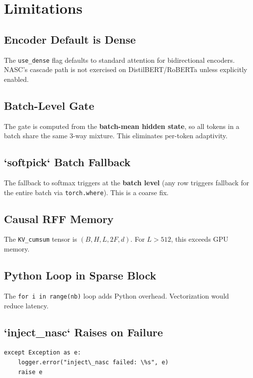 
\section{Limitations}

\subsection{Encoder Default is Dense}

The \texttt{use\_dense} flag defaults to standard attention for bidirectional 
encoders. NASC's cascade path is not exercised on DistilBERT/RoBERTa 
unless explicitly enabled.

\subsection{Batch-Level Gate}

The gate is computed from the \textbf{batch-mean hidden state}, so all tokens 
in a batch share the same 3-way mixture. This eliminates per-token 
adaptivity.

\subsection{`softpick` Batch Fallback}

The fallback to softmax triggers at the \textbf{batch level} (any row triggers 
fallback for the entire batch via \texttt{torch.where}). This is a coarse fix.

\subsection{Causal RFF Memory}

The \texttt{KV\_cumsum} tensor is $(B, H, L, 2F, d)$. For $L > 512$, this exceeds 
GPU memory.

\subsection{Python Loop in Sparse Block}

The \texttt{for i in range(nb)} loop adds Python overhead. Vectorization would 
reduce latency.

\subsection{`inject\_nasc` Raises on Failure}

\begin{lstlisting}
except Exception as e:
    logger.error("inject\_nasc failed: \%s", e)
    raise e
\end{lstlisting}

